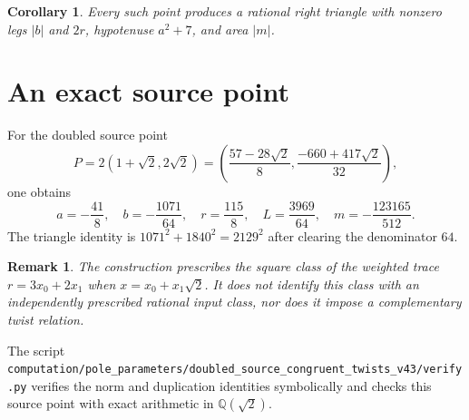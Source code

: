 \documentclass[11pt,a4paper]{article}
\newtheorem{corollary}[theorem]{Corollary}
\newtheorem{remark}[theorem]{Remark}
\newcommand{\Q}{\mathbb Q}
\begin{document}
\begin{corollary}
Every such point produces a rational right triangle with nonzero legs
$|b|$ and $2r$, hypotenuse $a^2+7$, and area $|m|$.
\end{corollary}

\section{An exact source point}

For the doubled source point
\[
 P=2(1+\sqrt2,2\sqrt2)
   =\left(\frac{57-28\sqrt2}{8},
            \frac{-660+417\sqrt2}{32}\right),
\]
one obtains
\[
  a=-\frac{41}{8},\quad b=-\frac{1071}{64},\quad
  r=\frac{115}{8},\quad L=\frac{3969}{64},\quad
  m=-\frac{123165}{512}.
\]
The triangle identity is
$1071^2+1840^2=2129^2$ after clearing the denominator $64$.

\begin{remark}
The construction prescribes the square class of the weighted trace
$r=3x_0+2x_1$ when $x=x_0+x_1\sqrt2$. It does not identify this class
with an independently prescribed rational input class, nor does it impose
a complementary twist relation.
\end{remark}

The script
\nolinkurl{computation/pole_parameters/doubled_source_congruent_twists_v43/verify.py}
verifies the norm and duplication identities symbolically and checks
this source point with exact arithmetic in $\Q(\sqrt2)$.
\end{document}
